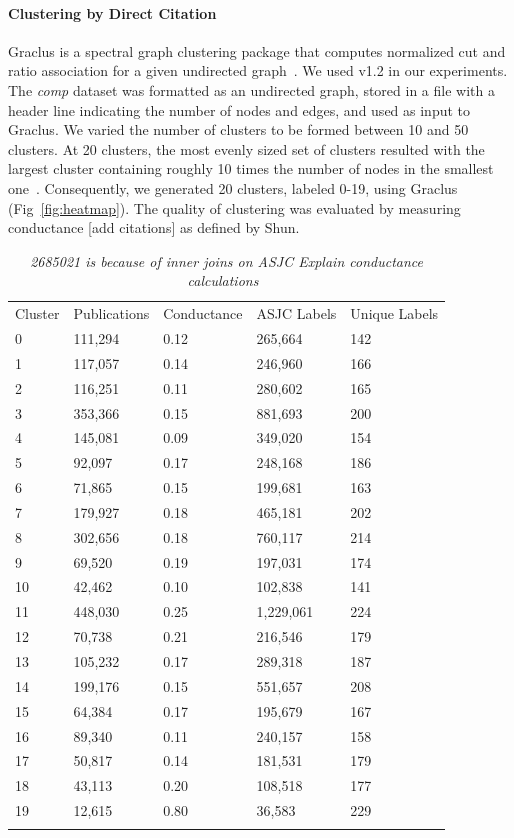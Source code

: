 \paragraph{Clustering by Direct Citation} Graclus is a spectral graph clustering package that computes normalized cut and ratio association for a given undirected graph~\cite{graclus_2007}.  We used v1.2 in our experiments.
The \emph{comp} dataset was formatted as an undirected graph, stored in a file with a header line indicating the number of nodes and edges, and used as input to Graclus. We varied the number of clusters to be formed between 10 and 50 clusters. At 20 clusters, the most evenly sized set of clusters resulted with the largest cluster containing roughly 10 times the number of nodes in the smallest one~\cite{traag_louvain_2019}. Consequently, we generated 20 clusters, labeled 0-19, using Graclus (Fig~\ref{fig:heatmap}). The quality of clustering was evaluated by measuring conductance [add citations] as defined by Shun.

\begin{table}
\caption{\emph{2685021 is because of inner joins on ASJC Explain conductance calculations~\cite{shun_parallel_2016}}}
\label{tab:1}       %
\begin{tabular}{lllll}
\hline\noalign{\smallskip}
Cluster & Publications & Conductance & ASJC Labels & Unique Labels\\
\noalign{\smallskip}\hline\noalign{\smallskip}
0 & 111,294 & 0.12 & 265,664 & 142 \\ 
1 & 117,057 & 0.14 & 246,960 & 166 \\ 
2 & 116,251 & 0.11 & 280,602 & 165 \\ 
3 & 353,366 & 0.15 & 881,693 & 200 \\ 
4 & 145,081 & 0.09 & 349,020 & 154 \\ 
5 & 92,097 & 0.17 & 248,168 & 186 \\ 
6 & 71,865 & 0.15 & 199,681 & 163 \\ 
7 & 179,927 & 0.18 & 465,181 & 202 \\ 
8 & 302,656 & 0.18 & 760,117 & 214 \\ 
9 & 69,520 & 0.19 & 197,031 & 174 \\ 
10 & 42,462 & 0.10 & 102,838 & 141 \\ 
11 & 448,030 & 0.25 & 1,229,061 & 224 \\ 
12 & 70,738 & 0.21 & 216,546 & 179 \\ 
13 & 105,232 & 0.17 & 289,318 & 187 \\ 
14 & 199,176 & 0.15 & 551,657 & 208 \\ 
15 & 64,384 & 0.17 & 195,679 & 167 \\ 
16 & 89,340 & 0.11 & 240,157 & 158 \\ 
17 & 50,817 & 0.14 & 181,531 & 179 \\ 
18 & 43,113 & 0.20 & 108,518 & 177 \\ 
19 & 12,615 & 0.80 & 36,583 & 229 \\ \noalign{\smallskip}\hline
\end{tabular}
\end{table}

